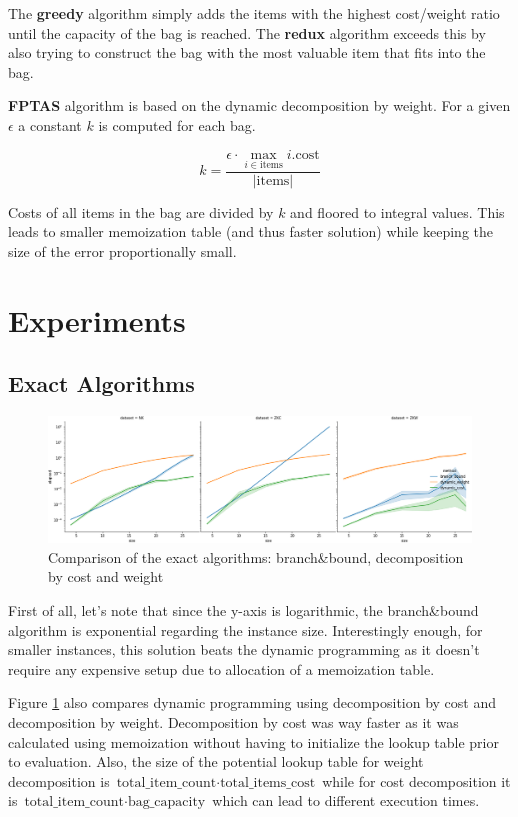 \documentclass[a4paper,10pt]{article}
\begin{document}
The \textbf{greedy} algorithm simply adds the items with the highest cost/weight ratio until the capacity of the bag is reached. The \textbf{redux} algorithm exceeds this by also trying to construct the bag with the most valuable item that fits into the bag.

\textbf{FPTAS} algorithm is based on the dynamic decomposition by weight. For a given $\epsilon$ a constant $k$ is computed for each bag. 

\begin{equation}
k = \frac{\epsilon \cdot \max_{i \in \textrm{items}} i.\textrm{cost}}{|\textrm{items}|}
\end{equation}

Costs of all items in the bag are divided by $k$ and floored to integral values. This leads to smaller memoization table (and thus faster solution) while keeping the size of the error proportionally small.
\section{Experiments}

\subsection{Exact Algorithms}

\begin{figure}[!htb]
	\centering
  	\includegraphics[width=\textwidth]{images/exacts_comparison.png}
	\caption{Comparison of the exact algorithms: branch\&bound, decomposition by cost and weight}
	\label{exacts_comparison}
\end{figure}

First of all, let's note that since the y-axis is logarithmic, the branch\&bound algorithm is exponential regarding the instance size. Interestingly enough, for smaller instances, this solution beats the dynamic programming as it doesn't require any expensive setup due to allocation of a memoization table.

Figure \ref{exacts_comparison} also compares dynamic programming using decomposition by cost and decomposition by weight. Decomposition by cost was way faster as it was calculated using memoization without having to initialize the lookup table prior to evaluation. Also, the size of the potential lookup table for weight decomposition is $\textrm{total\_item\_count} \cdot \textrm{total\_items\_cost}$ while for cost decomposition it is $\textrm{total\_item\_count} \cdot \textrm{bag\_capacity}$ which can lead to different execution times.
\end{document}
